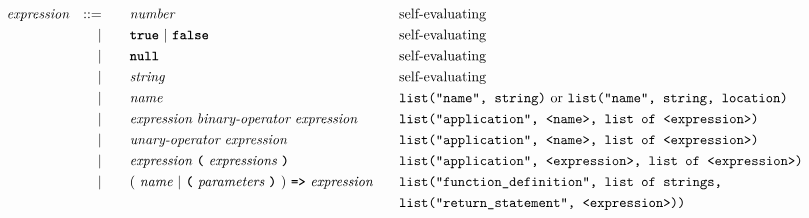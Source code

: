 \begin{alignat*}{9}
                                           && \textit{expression}   && ::= &\quad &&  \textit{number}   && \textrm{self-evaluating} \\
&&                       && |   &\quad && \textbf{\texttt{true}}\ |\ \textbf{\texttt{false}}
                                                           && \textrm{self-evaluating} \\
&&                       && |   &\quad && \textbf{\texttt{null}}
                                                           && \textrm{self-evaluating} \\
&&                       && |   &\quad &&  \textit{string}   && \textrm{self-evaluating} \\
&&                       && |   &\quad &&  \textit{name}   && \texttt{list("name", string)} \ \textrm{or}\ \texttt{list("name", string, location)} \\
&&                       && |   &\quad &&  \textit{expression} \  \textit{binary-operator} \ 
                                            \textit{expression} \qquad
                                                           && \texttt{list("application", <name>, list of <expression>)} \\
&&                       && |   &\quad &&   \textit{unary-operator} \ 
                                            \textit{expression}
                                                           && \texttt{list("application", <name>, list of <expression>)} \\
&&                       && |   &\quad &&   \textit{expression} \ 
                                            \textbf{\texttt{(}}\ \textit{expressions}\
                                            \textbf{\texttt{)}}
                                                           && \texttt{list("application", <expression>, list of <expression>)} \\
&&                       && |   &\quad &&   (\ \textit{name}\ | \
                                               \textbf{\texttt{(}}\ \textit{parameters}\ \textbf{\texttt{)}}\
                                            )\    
                                            \texttt{\textbf{=>}}\ \textit{expression}
                                            && \texttt{list("function\_definition", list of strings,}  \\
                                              && && & && && \texttt{list("return\_statement", <expression>))} \\

\end{alignat*}

